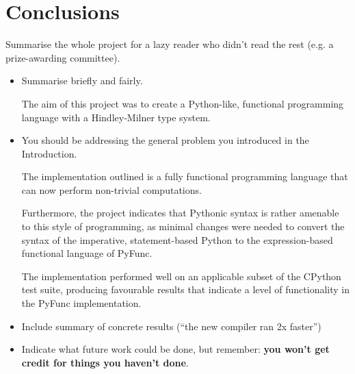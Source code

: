 \documentclass{l4proj}
\begin{document}
\chapter{Conclusions}    
Summarise the whole project for a lazy reader who didn't read the rest (e.g. a prize-awarding committee).
\begin{itemize}
    \item
        Summarise briefly and fairly.

        The aim of this project was to create a Python-like, functional programming language with a Hindley-Milner type system.
    \item
        You should be addressing the general problem you introduced in the
        Introduction. 
        
        The implementation outlined is a fully functional programming language that can now perform non-trivial computations.

        Furthermore, the project indicates that Pythonic syntax is rather amenable to this style of programming, as minimal changes were needed to convert the syntax of the imperative, statement-based Python to the expression-based functional language of PyFunc.

        The implementation performed well on an applicable subset of the CPython test suite, producing favourable results that indicate a level of functionality in the PyFunc implementation.

    \item
        Include summary of concrete results (``the new compiler ran 2x
        faster'')
    \item
        Indicate what future work could be done, but remember: \textbf{you
        won't get credit for things you haven't done}.
\end{itemize}

%
% 
\end{document}
